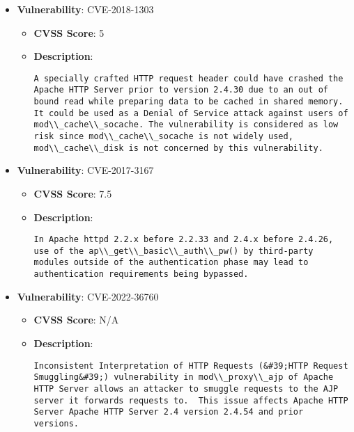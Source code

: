 \documentclass{article}
\begin{document}
\begin{itemize}
        \item \textbf{Vulnerability}: CVE-2018-1303
        \begin{itemize}
            \item \textbf{CVSS Score}:  5 
            \item \textbf{Description}:
            \parbox[t]{0.9\linewidth}{
                \verb|A specially crafted HTTP request header could have crashed the Apache HTTP Server prior to version 2.4.30 due to an out of bound read while preparing data to be cached in shared memory. It could be used as a Denial of Service attack against users of mod\\_cache\\_socache. The vulnerability is considered as low risk since mod\\_cache\\_socache is not widely used, mod\\_cache\\_disk is not concerned by this vulnerability.|
            }
        \end{itemize}
    
        \item \textbf{Vulnerability}: CVE-2017-3167
        \begin{itemize}
            \item \textbf{CVSS Score}:  7.5 
            \item \textbf{Description}:
            \parbox[t]{0.9\linewidth}{
                \verb|In Apache httpd 2.2.x before 2.2.33 and 2.4.x before 2.4.26, use of the ap\\_get\\_basic\\_auth\\_pw() by third-party modules outside of the authentication phase may lead to authentication requirements being bypassed.|
            }
        \end{itemize}
    
        \item \textbf{Vulnerability}: CVE-2022-36760
        \begin{itemize}
            \item \textbf{CVSS Score}:  N/A 
            \item \textbf{Description}:
            \parbox[t]{0.9\linewidth}{
                \verb|Inconsistent Interpretation of HTTP Requests (&#39;HTTP Request Smuggling&#39;) vulnerability in mod\\_proxy\\_ajp of Apache HTTP Server allows an attacker to smuggle requests to the AJP server it forwards requests to.  This issue affects Apache HTTP Server Apache HTTP Server 2.4 version 2.4.54 and prior versions.|
            }
        \end{itemize}
    

\end{itemize}
\end{document}
